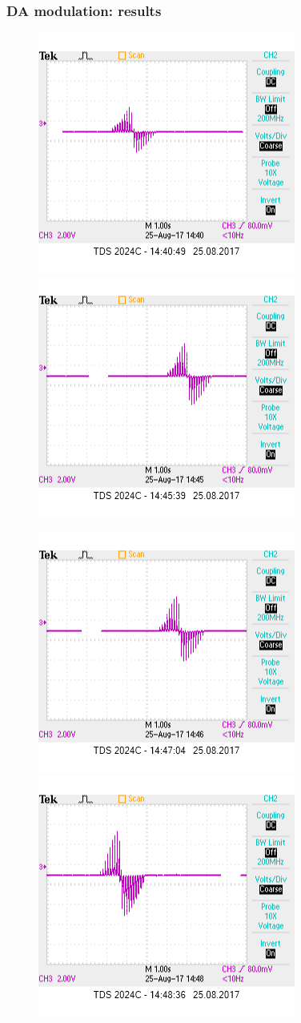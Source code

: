 \documentclass[12pt, aspectratio=169]{beamer}
\begin{document}
\begin{frame}
  \frametitle{DA modulation: results}
  
\begin{figure}
\includegraphics[width=0.3\linewidth]{hebb_r_0_50K}
\includegraphics[width=0.3\linewidth]{hebb_r_25_25K}
\end{figure}
\begin{figure}
\includegraphics[width=0.3\linewidth]{hebb_r_37_5_12_5K}
\includegraphics[width=0.3\linewidth]{hebb_r_50_0K}
\end{figure}

\end{frame}


\end{document}
